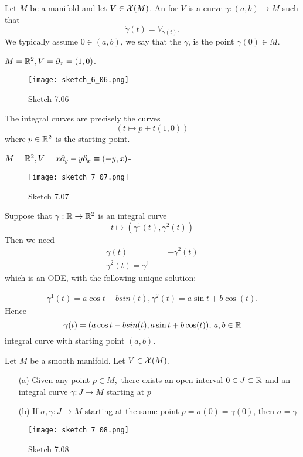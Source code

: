 \begin{definition*}
    Let \(M\) be a manifold and let \(V\in \mathcal{X}(M)\). An  for \(V\) is a curve 
    \(\gamma:(a,b)\to M\) such that 
    \[\dot{\gamma}(t)=V_{\gamma(t)}.\]   
    We typically assume \(0\in (a,b)\), we say that the  \(\gamma\), is the point \(\gamma(0)\in M\).
\end{definition*}

\begin{example}
    \(M=\mathbb{R}^2,V=\partial_x=(1,0)\).
    \begin{figure}[H]\label{fig:7.06}
        \centering
        \texttt{[image: sketch\_6\_06.png]}
        \caption{Sketch 7.06}
    \end{figure}
    The integral curves are precisely the curves 
    \[(t\mapsto p+t(1,0))\]
    where \(p\in \mathbb{R}^2\) is the starting point.
\end{example}

\begin{example}
    \(M=\mathbb{R}^2,V=x\partial_y-y\partial_x\equiv (-y,x)\)-
    \begin{figure}[H]\label{fig:7.07}
        \centering
        \texttt{[image: sketch\_7\_07.png]}
        \caption{Sketch 7.07}
    \end{figure}

    Suppose that \(\gamma:\mathbb{R}\to \mathbb{R}^2\) is an integral curve
    \[t\mapsto (\gamma^1(t),\gamma^2(t))\]
    Then we need \begin{align*}
        \dot{\gamma}(t)&=-\gamma^2(t)\\
        \dot{\gamma}^2(t) = \gamma^1
    \end{align*}
    which is an ODE, with the following unique solution: 
    
    \begin{align*}
        \gamma^1(t)=a\cos t-b sin (t), 
        \gamma^2(t)=a \sin t + b\cos(t).
    \end{align*}
    Hence \[\gamma(t)=(a\cos t-b sin (t),a \sin t + b\cos(t))\text{, }a,b\in \mathbb{R}\]
    integral curve with starting point \((a,b)\).
\end{example}
\begin{proposition}\label{prop:7.9}
    Let \(M\) be a smooth manifold. Let \(V\in \mathcal{X}(M)\).
    \begin{enumerate}
        \item[(a)]  Given any point \(p\in M,\) there exists an open interval \(0\in J\subset \mathbb{R}\) and 
                   an integral curve \(\gamma:J\to M\) starting at \(p\)
        \item[(b)]  If \(\sigma,\gamma:J\to M\) starting at the same point \(p=\sigma(0)=\gamma(0)\), then \(\sigma=\gamma\)
    \end{enumerate}
    \begin{figure}[H]\label{fig:7.08}
        \centering
        \texttt{[image: sketch\_7\_08.png]}
        \caption{Sketch 7.08}
    \end{figure}
\end{proposition}

